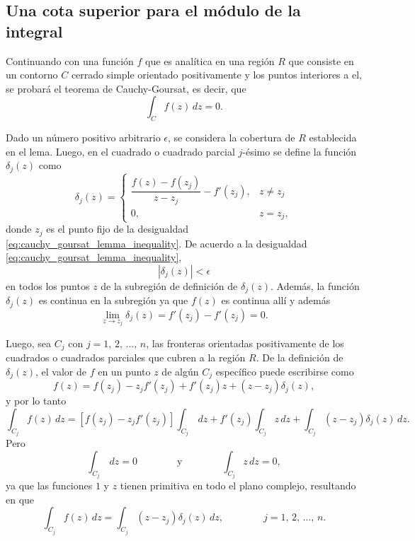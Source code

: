 \documentclass[a4paper]{report}
\begin{document}
\subsection*{Una cota superior para el módulo de la integral}

Continuando con una función \(f\) que es analítica en una región \(R\) que consiste en un contorno \(C\) cerrado simple orientado positivamente y los puntos interiores a el, se probará el teorema de Cauchy-Goursat, es decir, que 
\[
 \int_Cf(z)\,dz=0.
\]

Dado un número positivo arbitrario \(\epsilon\), se considera la cobertura de \(R\) establecida en el lema. Luego, en el cuadrado o cuadrado parcial \(j\)-ésimo se define la función \(\delta_j(z)\) como
\[
 \delta_j(z)=
 \left\{
 \begin{array}{ll}
  \dfrac{f(z)-f(z_j)}{z-z_j}-f'(z_j), & z\neq z_j\\
  0, & z=z_j,
 \end{array}
 \right.
\]
donde \(z_j\) es el punto fijo de la desigualdad \ref{eq:cauchy_goursat_lemma_inequality}. De acuerdo a la desigualdad \ref{eq:cauchy_goursat_lemma_inequality},
\begin{equation}\label{eq:cauchy_goursat_theorem_deltaj_bound}
 |\delta_j(z)|<\epsilon 
\end{equation}
en todos los puntos \(z\) de la subregión de definición de \(\delta_j(z)\). Además, la función \(\delta_j(z)\) es continua en la subregión ya que \(f(z)\) es continua allí y además
\[
 \lim_{z\to z_j}\delta_j(z)=f'(z_j)-f'(z_j)=0.
\]

Luego, sea \(C_j\) con \(j=1,\,2,\,\dots,\,n\), las fronteras orientadas positivamente de los cuadrados o cuadrados parciales que cubren a la región \(R\). De la definición de \(\delta_j(z)\), el valor de \(f\) en un punto \(z\) de algún \(C_j\) específico puede escribirse como
\[
 f(z)=f(z_j)-z_jf'(z_j)+f'(z_j)z+(z-z_j)\delta_j(z),
\]
y por lo tanto
\[
 \int_{C_j}f(z)\,dz=[f(z_j)-z_jf'(z_j)]\int_{C_j}\,dz+f'(z_j)\int_{C_j}z\,dz+\int_{C_j}(z-z_j)\delta_j(z)\,dz.
\]
Pero
\[
 \int_{C_j}\,dz=0
 \qquad\qquad\textrm{y}\qquad\qquad
 \int_{C_j}z\,dz=0,
\]
ya que las funciones \(1\) y \(z\) tienen primitiva en todo el plano complejo, resultando en que 
\begin{equation}\label{eq:cauchy_goursat_theorm_cj_integrals}
 \int_{C_j}f(z)\,dz=\int_{C_j}(z-z_j)\delta_j(z)\,dz,
 \qquad\qquad 
 j=1,\,2,\,\dots,\,n. 
\end{equation}
\end{document}
